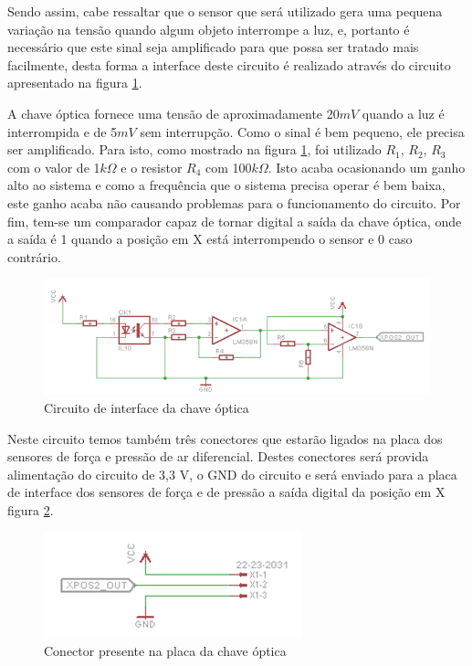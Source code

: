 Sendo assim, cabe ressaltar que o sensor que será utilizado gera uma pequena variação na tensão quando algum objeto interrompe a luz, e, portanto é necessário que este sinal seja amplificado para que possa ser tratado mais facilmente, desta forma a interface deste circuito é realizado através do circuito apresentado na figura \ref{circuito3}.

A chave óptica fornece uma tensão de aproximadamente 20$mV$ quando a luz é interrompida e de 5$mV$ sem interrupção. Como o sinal é bem pequeno, ele precisa ser amplificado. Para isto, como mostrado na figura \ref{circuito3}, foi utilizado $R_1$, $R_2$, $R_3$ com o valor de 1$k\Omega$ e o resistor $R_4$ com 100$k\Omega$. Isto acaba ocasionando um ganho alto ao sistema e como a frequência que o sistema precisa operar é bem baixa, este ganho acaba não causando problemas para o funcionamento do circuito. Por fim, tem-se um comparador capaz de tornar digital a saída da chave óptica, onde a saída é 1 quando a posição em X está interrompendo o sensor e 0 caso contrário.

\begin{figure}[H]
		\centering
			\includegraphics[scale=0.9]{figuras/circuito3.png}
		\caption{Circuito de interface da chave óptica}
		\label{circuito3}
\end{figure}

Neste circuito temos também três conectores que estarão ligados na placa dos sensores de força e pressão de ar diferencial. Destes conectores será provida alimentação do circuito de 3,3 V, o GND do circuito e será enviado para a placa de interface dos sensores de força e de pressão a saída digital da posição em X figura \ref{conectchave}.

\begin{figure}[H]
		\centering
			\includegraphics[scale=1.0]{figuras/conectchave.png}
		\caption{Conector presente na placa da chave óptica}
		\label{conectchave}
\end{figure}

